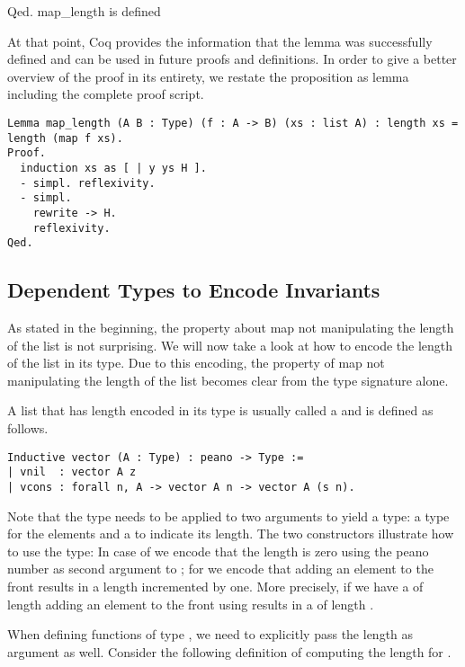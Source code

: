 \begin{cproof}{Qed.}
map_length is defined
\end{cproof}

At that point, Coq provides the information that the lemma  was successfully defined and can be used in future proofs and definitions.
In order to give a better overview of the proof in its entirety, we restate the proposition as lemma including the complete proof script.

\begin{verbatim}
Lemma map_length (A B : Type) (f : A -> B) (xs : list A) : length xs = length (map f xs).
Proof.
  induction xs as [ | y ys H ].
  - simpl. reflexivity.
  - simpl.
    rewrite -> H.
    reflexivity.
Qed.
\end{verbatim}

\subsection{Dependent Types to Encode Invariants}

As stated in the beginning, the property about map not manipulating the length of the list is not surprising.
We will now take a look at how to encode the length of the list in its type.
Due to this encoding, the property of map not manipulating the length of the list becomes clear from the type signature alone.

A list that has length encoded in its type is usually called a  and is defined as follows.

\begin{verbatim}
Inductive vector (A : Type) : peano -> Type :=
| vnil  : vector A z
| vcons : forall n, A -> vector A n -> vector A (s n).
\end{verbatim}

Note that the type  needs to be applied to two arguments to yield a type: a type for the elements and a  to indicate its length.
The two constructors illustrate how to use the type: In case of  we encode that the length is zero using the peano number  as second argument to ; for  we encode that adding an element to the front results in a length incremented by one.
More precisely, if we have a  of length  adding an element to the front using  results in a  of length .

When defining functions of type , we need to explicitly pass the length as argument as well.
Consider the following definition of computing the length for .

